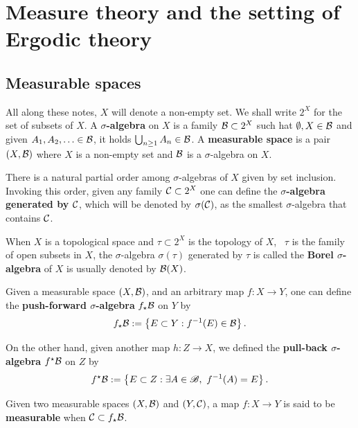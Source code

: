 \section{Measure theory and the setting of Ergodic theory}\label{sec:measure-theory}

\subsection{Measurable spaces}\label{sec:measurable-spapces}

All along these notes, $X$ will denote a non-empty set. We shall write $2^{X}$ for the set of subsets of $X$. A \textbf{$\sigma$-algebra} on $X$ is a family $\mathcal{B}\subset 2^{X}$ such hat $\emptyset,X\in\mathcal{B}$ and given $A_{1},A_{2},\ldots\in\mathcal{B}$, it holds $\bigcup_{n\geq 1} A_{n}\in\mathcal{B}$. A \textbf{measurable space} is a pair $(X,\mathcal{B})$ where $X$ is a non-empty set and $\mathcal{B}$ is a $\sigma$-algebra on $X$.

There is a natural partial order among $\sigma$-algebras of $X$ given by set inclusion. Invoking this order, given any family $\mathcal{C}\subset 2^{X}$ one can define the \textbf{$\sigma$-algebra generated by $\mathcal{C}$}, which will be denoted by $\sigma({\mathcal{C}})$, as the smallest $\sigma$-algebra that contains $\mathcal{C}$.

When $X$ is a topological space and $\tau\subset 2^{X}$ is the topology of $X$, \ie~$\tau$ is the family of open subsets in $X$, the $\sigma$-algebra $\sigma(\tau)$ generated by $\tau$ is called the \textbf{Borel $\sigma$-algebra} of $X$ is usually denoted by $\mathcal{B}(X)$.


Given a measurable space $(X,\mathcal{B})$, and an arbitrary map $f\colon X\to Y$, one can define the \textbf{push-forward $\sigma$-algebra} $f_{\star}\mathcal{B}$ on $Y$ by
\begin{equation}
  \label{eq:push-forward-sigma-alg-def}
  f_{\star}\mathcal{B}:=\left\{E\subset Y : f^{-1}(E)\in\mathcal{B}\right\}.
\end{equation}

On the other hand, given another map $h\colon Z\to X$, we defined the \textbf{pull-back $\sigma$-algebra} $f^{\star}\mathcal{B}$ on $Z$ by
\begin{equation}
  \label{eq:pull-back-sigma-alg-def}
  f^{\star}\mc{B}:=\left\{E\subset Z : \exists A\in\B,\ f^{-1}(A)=E\right\}.
\end{equation}

Given two measurable spaces $(X,\mathcal{B})$ and $(Y,\mathcal{C})$, a map $f\colon X\to Y$ is said to be \textbf{measurable} when $\mathcal{C}\subset f_{\star}\mathcal{B}$.

